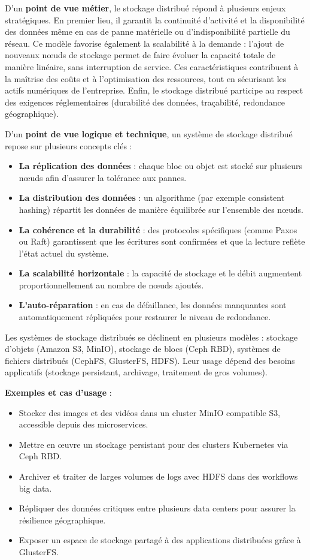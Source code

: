 D’un \textbf{point de vue métier}, le stockage distribué répond à plusieurs enjeux stratégiques. En premier lieu, il garantit la continuité d’activité et la disponibilité des données même en cas de panne matérielle ou d’indisponibilité partielle du réseau. Ce modèle favorise également la scalabilité à la demande  : l’ajout de nouveaux nœuds de stockage permet de faire évoluer la capacité totale de manière linéaire, sans interruption de service. Ces caractéristiques contribuent à la maîtrise des coûts et à l’optimisation des ressources, tout en sécurisant les actifs numériques de l’entreprise. Enfin, le stockage distribué participe au respect des exigences réglementaires (durabilité des données, traçabilité, redondance géographique).

D’un \textbf{point de vue logique et technique}, un système de stockage distribué repose sur plusieurs concepts clés :
\begin{itemize}
	\item \textbf{La réplication des données}  : chaque bloc ou objet est stocké sur plusieurs nœuds afin d’assurer la tolérance aux pannes.
	\item \textbf{La distribution des données}  : un algorithme (par exemple consistent hashing) répartit les données de manière équilibrée sur l’ensemble des nœuds.
	\item \textbf{La cohérence et la durabilité}  : des protocoles spécifiques (comme Paxos ou Raft) garantissent que les écritures sont confirmées et que la lecture reflète l’état actuel du système.
	\item \textbf{La scalabilité horizontale}  : la capacité de stockage et le débit augmentent proportionnellement au nombre de nœuds ajoutés.
	\item \textbf{L’auto-réparation}  : en cas de défaillance, les données manquantes sont automatiquement répliquées pour restaurer le niveau de redondance.
\end{itemize}

Les systèmes de stockage distribués se déclinent en plusieurs modèles  : stockage d’objets (Amazon S3, MinIO), stockage de blocs (Ceph RBD), systèmes de fichiers distribués (CephFS, GlusterFS, HDFS). Leur usage dépend des besoins applicatifs (stockage persistant, archivage, traitement de gros volumes).

\textbf{Exemples et cas d’usage} :
\begin{itemize}
	\item Stocker des images et des vidéos dans un cluster MinIO compatible S3, accessible depuis des microservices.
	\item Mettre en œuvre un stockage persistant pour des clusters Kubernetes via Ceph RBD.
	\item Archiver et traiter de larges volumes de logs avec HDFS dans des workflows big data.
	\item Répliquer des données critiques entre plusieurs data centers pour assurer la résilience géographique.
	\item Exposer un espace de stockage partagé à des applications distribuées grâce à GlusterFS.
\end{itemize}

